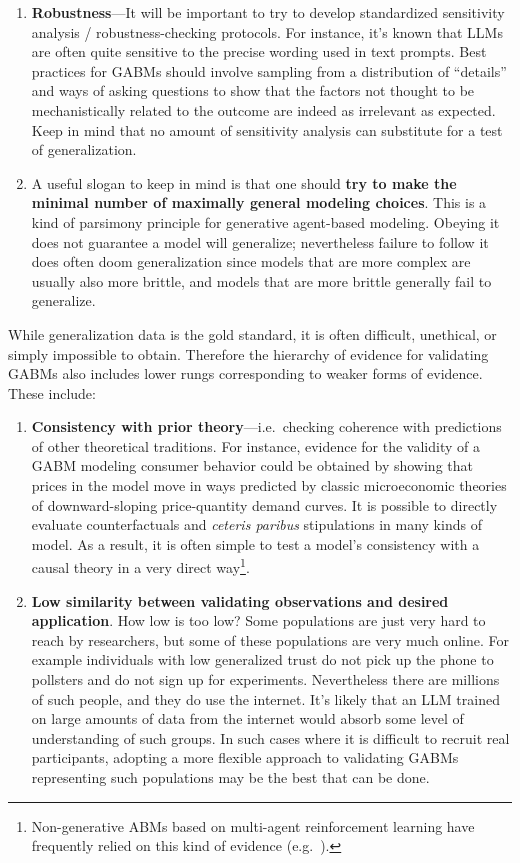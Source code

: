 \documentclass[11pt, a4paper, logo, twocolumn, internal, copyright, numbering]{googledeepmind}
\begin{document}
\begin{enumerate}
    \item \textbf{Robustness}---It will be important to try to develop standardized sensitivity analysis / robustness-checking protocols. For instance, it's known that LLMs are often quite sensitive to the precise wording used in text prompts. Best practices for GABMs should involve sampling from a distribution of ``details'' and ways of asking questions to show that the factors not thought to be mechanistically related to the outcome are indeed as irrelevant as expected. Keep in mind that no amount of sensitivity analysis can substitute for a test of generalization.
    
    \item A useful slogan to keep in mind is that one should \textbf{try to make the minimal number of maximally general modeling choices}. This is a kind of parsimony principle for generative agent-based modeling. Obeying it does not guarantee a model will generalize; nevertheless failure to follow it does often doom generalization since models that are more complex are usually also more brittle, and models that are more brittle generally fail to generalize.
\end{enumerate}

While generalization data is the gold standard, it is often difficult, unethical, or simply impossible to obtain. Therefore the hierarchy of evidence for validating GABMs also includes lower rungs corresponding to weaker forms of evidence. These include:
\begin{enumerate}
    \item \textbf{Consistency with prior theory}---i.e.~checking coherence with predictions of other theoretical traditions. For instance, evidence for the validity of a GABM modeling consumer behavior could be obtained by showing that prices in the model move in ways predicted by classic microeconomic theories of downward-sloping price-quantity demand curves. It is possible to directly evaluate counterfactuals and \textit{ceteris paribus} stipulations in many kinds of model. As a result, it is often simple to test a model's consistency with a causal theory in a very direct way\footnote{Non-generative ABMs based on multi-agent reinforcement learning have frequently relied on this kind of evidence (e.g.~\cite{perolat2017multi, johanson2022emergent}).}.
            
    \item \textbf{Low similarity between validating observations and desired application}. How low is too low? Some populations are just very hard to reach by researchers, but some of these populations are very much online. For example individuals with low generalized trust do not pick up the phone to pollsters and do not sign up for experiments. Nevertheless there are millions of such people, and they do use the internet. It's likely that an LLM trained on large amounts of data from the internet would absorb some level of understanding of such groups. In such cases where it is difficult to recruit real participants, adopting a more flexible approach to validating GABMs representing such populations may be the best that can be done.
\end{enumerate}
\end{document}
